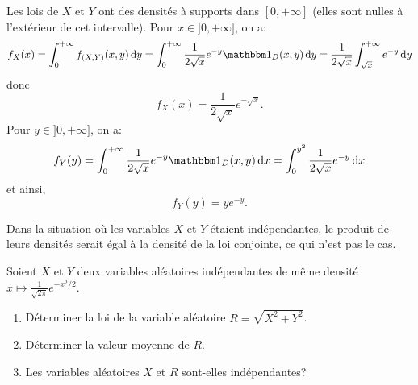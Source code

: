 \documentclass[11pt, a4paper]{article}
\begin{document}
\begin{solution}
  Les lois de $X$ et $Y$ ont des densités à supports dans
  $[0, +\infty]$ (elles sont nulles à l'extérieur de cet
  intervalle). Pour $x \in ]0, +\infty]$, on a:
  \[
  f_X(x) = \int_0^{+\infty} f_{(X, Y)}(x, y)\dd{y} = \int_0^{+\infty}
  \frac{1}{2\sqrt{x}} e^{-y} \bOne_D(x,y)\dd{y} =
  \frac{1}{2\sqrt{x}}\int_{\sqrt{x}}^{+\infty}e^{-y}\dd{y}
  \]
  donc
  \[
  f_X(x) = \frac{1}{2\sqrt{x}}e^{-\sqrt{x}}.
  \]
  Pour $y \in ]0, +\infty]$, on a:
  \[
    f_Y(y)  = \int_0^{+\infty} \frac{1}{2\sqrt{x}}e^{-y}\bOne_D(x, y)\dd{x}
            = \int_0^{y^2} \frac{1}{2\sqrt{x}} e^{-y}\dd{x}
  \]
  et ainsi,
  \[
  f_Y(y)  = ye^{-y}.
  \]

   \noindent Dans la situation où les variables $X$ et $Y$ étaient
   indépendantes, le produit de leurs densités serait égal à la
   densité de la loi conjointe, ce qui n'est pas le cas.
\end{solution}

\begin{question}
  Soient $X$ et $Y$ deux variables aléatoires indépendantes de même
  densité $x \mapsto \frac{1}{\sqrt{2\pi}}e^{-x^2/2}$.
  \begin{enumerate}
  \item Déterminer la loi de la variable aléatoire $R = \sqrt{X^2+Y^2}$.
  \item Déterminer la valeur moyenne de $R$.
  \item Les variables aléatoires $X$ et $R$ sont-elles indépendantes?
  \end{enumerate}
\end{question}
\end{document}
